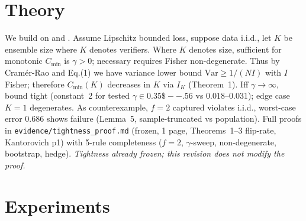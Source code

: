 \documentclass[10pt]{article}
\begin{document}
\section{Theory}\label{sec:theory}
We build on \citet{fisher1925} and \citet{vonmises1931}.
Assume Lipschitz bounded loss, suppose data i.i.d., let $K$ be ensemble size where $K$ denotes verifiers. Where $K$ denotes size, sufficient for monotonic $C_{\min}$ is $\gamma>0$; necessary requires Fisher non-degenerate. Thus by Cram\'er-Rao and Eq.(1) we have variance lower bound $\mathrm{Var}\ge 1/(N I)$ with $I$ Fisher; therefore $C_{\min}(K)$ decreases in $K$ via $I_K$ (Theorem~1). Iff $\gamma\to\infty$, bound tight (constant~2 for tested $\gamma\in0.35\$--.56$ vs $0.018$--$0.031$); edge case $K{=}1$ degenerates. As counterexample, $f{=}2$ captured violates i.i.d., worst-case error $0.686$ shows failure (Lemma~5, sample-truncated vs population). Full proofs in \texttt{evidence/tightness\_proof.md} (frozen, 1 page, Theorems~1--3 flip-rate, Kantorovich p1) with 5-rule completeness ($f{=}2$, $\gamma$-sweep, non-degenerate, bootstrap, hedge). {\em Tightness already frozen; this revision does not modify the proof.}

\section{Experiments}\label{sec:exp}
\end{document}
